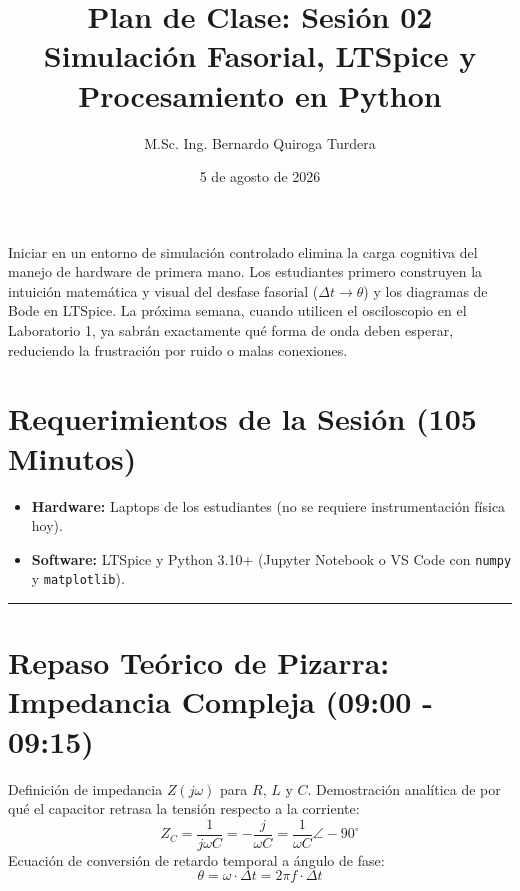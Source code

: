 \documentclass[11pt,a4paper]{article}
\title{\vspace{-1.5cm}\Large\textbf{Plan de Clase: Sesión 02}\\
\large Simulación Fasorial, LTSpice y Procesamiento en Python}
\author{M.Sc. Ing. Bernardo Quiroga Turdera}
\date{5 de agosto de 2026}
\begin{document}
\maketitle
\vspace{-0.5cm}

\begin{tcolorbox}[colback=blue!5, colframe=blue!40!black, title=\textbf{Justificación Pedagógica (Enfoque CDIO)}]
Iniciar en un entorno de simulación controlado elimina la carga cognitiva del manejo de hardware de primera mano. Los estudiantes primero construyen la intuición matemática y visual del desfase fasorial ($\Delta t \to \theta$) y los diagramas de Bode en LTSpice. La próxima semana, cuando utilicen el osciloscopio en el Laboratorio 1, ya sabrán exactamente qué forma de onda deben esperar, reduciendo la frustración por ruido o malas conexiones.
\end{tcolorbox}

\section*{Requerimientos de la Sesión (105 Minutos)}
\begin{itemize}[label=$\circ$]
    \item \textbf{Hardware:} Laptops de los estudiantes (no se requiere instrumentación física hoy).
    \item \textbf{Software:} LTSpice y Python 3.10+ (Jupyter Notebook o VS Code con \texttt{numpy} y \texttt{matplotlib}).
\end{itemize}

\vspace{0.5cm}
\hrule
\vspace{0.5cm}

\section{Repaso Teórico de Pizarra: Impedancia Compleja (09:00 - 09:15)}
Definición de impedancia $Z(j\omega)$ para $R$, $L$ y $C$. Demostración analítica de por qué el capacitor retrasa la tensión respecto a la corriente:
\begin{equation}
    Z_C = \frac{1}{j\omega C} = -\frac{j}{\omega C} = \frac{1}{\omega C} \angle -90^\circ
\end{equation}
Ecuación de conversión de retardo temporal a ángulo de fase:
\begin{equation}
    \theta = \omega \cdot \Delta t = 2\pi f \cdot \Delta t
\end{equation}
\end{document}
